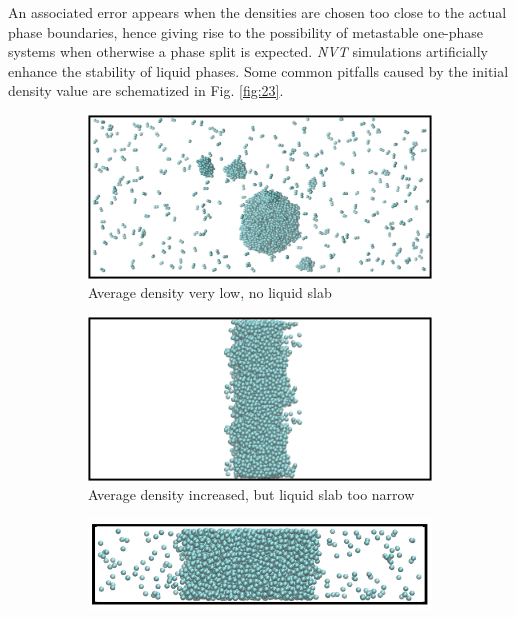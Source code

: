 \documentclass[9pt,bestpractices]{livecoms}
\begin{document}
An associated error appears when the densities are chosen too close to the
actual phase boundaries, hence giving rise to the possibility of metastable
one-phase systems when otherwise a phase split is expected. \textit{NVT}
simulations artificially enhance the stability of liquid phases. Some common
pitfalls caused by the initial density value are schematized in Fig. \ref{fig:23}.


\begin{figure}
	\centering
	\begin{subfigure}{0.3\textwidth} %
    \includegraphics[width=1\textwidth]{gfx/image70.png}
    \caption{Average density very low, no liquid slab}
	\end{subfigure}
	\begin{subfigure}{0.3\textwidth} %
    \includegraphics[width=1\textwidth]{gfx/image71.png}
    \caption{Average density increased, but liquid slab too narrow}
	\end{subfigure}
	\begin{subfigure}{0.3\textwidth} %
    \includegraphics[width=1\textwidth]{gfx/Fig_23c.jpeg}

\end{subfigure}
\end{figure}
\end{document}
